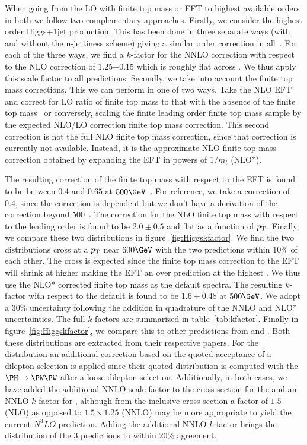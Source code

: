 When going from the LO with finite top mass or EFT to highest available orders in both we follow two complementary approaches. Firstly, we consider the highest order Higgs+1jet production. This has been done in three separate ways (with and without the n-jettiness scheme) giving a similar order correction in all~\cite{Chen:2014gva,Boughezal:2013uia,Boughezal:2015dra,Boughezal:2015aha}. For each of the three ways, we find a $k$-factor for the NNLO correction with respect to the NLO correction of 1.25$\pm0.15$ which is roughly flat across \pt. We thus apply this scale factor to all predictions. Secondly, we take into account the finite top mass corrections. This we can perform in one of two ways. Take the NLO EFT and correct for LO ratio of finite top mass to that with the absence of the finite top mass~\cite{Chen:2016zka} or conversely, scaling the finite leading order finite top mass sample by the expected NLO/LO correction finite top mass correction\cite{Neumann:2016dny}. This second correction is not the full NLO finite top mass correction, since that correction is currently not available. Instead, it is the approximate NLO finite top mass correction obtained by expanding the EFT in powers of $1/m_{t}$ (NLO*).

The resulting correction of the finite top mass with respect to the EFT is found to be between $0.4$ and $0.65$ at $500 \GeV$~\cite{Chen:2016zka}. For reference, we take a correction of 0.4, since the correction is \pt dependent but we don't have a derivation of the correction beyond 500~\GeV. The correction for the NLO finite top mass with respect to the leading order is found to be $2.0\pm0.5$ and flat as a function of $p_{\mathrm{T}}$. Finally, we compare these two distributions in figure~\ref{fig:Higgskfactor}. We find the two distributions cross at a $p_{\mathrm{T}}$ near $600\GeV$ with the two predictions within 10\% of each other. The cross is expected since the finite top mass correction to the EFT  will shrink at higher \pt making the EFT an over prediction at the highest \pt. We thus use the NLO* corrected finite top mass as the default spectra. The resulting $k$-factor with respect to the default \POWHEG is found to be $1.6\pm0.48$ at $500 \GeV$. We adopt a 30\% uncertainty following the addition in quadrature of the NNLO and NLO* uncertainties. The full $k$-factors are summarized in table~\ref{tab:kfactor}. Finally in figure~\ref{fig:Higgskfactor}, we compare this to other predictions from \SHERPA and \MCATNLO.  Both these distributions are extracted from their respective papers. For the \SHERPA distribution an additional correction based on the quoted acceptance of a dilepton selection is applied since their quoted \pt distribution is computed with the $\PH\rightarrow \PW\PW$  after a loose dilepton selection. Additionally, in both cases, we have added the additional NNLO scale factor to the cross section for the \SHERPA and an NNLO $k$-factor for \MCATNLO, although from the inclusive cross section a factor of $1.5$ (NLO) as opposed to $1.5\times1.25$ (NNLO) may be more appropriate to yield the current $N^{3}LO$ prediction. Adding the additional NNLO $k$-factor brings the distribution of the 3 predictions to within 20\% agreement.


